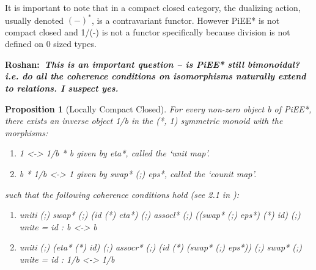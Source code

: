 \documentclass[preprint]{sigplanconf}
\newcommand{\xcomment}[2]{\textbf{#1:~\textsl{#2}}}
\newcommand{\roshan}[1]{\xcomment{Roshan}{#1}}
\newcommand{\asterix}[0]{*}
\newtheorem{proposition}[theorem]{Proposition}
\begin{document}
It is important to note that in a compact closed category, the
dualizing action, usually denoted $(-)^\asterix$, is a contravariant
functor. However {{PiEE*}} is not compact closed and {{1/(-)}} is not
a functor specifically because division is not defined on 0 sized
types.

\roshan{This is an important question -- is {{PiEE*}} still
  bimonoidal? i.e. do all the coherence conditions on isomorphisms
  naturally extend to relations. I suspect yes.}

\begin{proposition}[Locally Compact Closed]
For every non-zero object {{b}} of {{PiEE*}}, there exists an inverse
object {{1/b}} in the {{(*, 1)}} symmetric monoid with the morphisms:

\begin{enumerate}
\item {{1 <-> 1/b * b}} given by {{eta*}}, called the `unit map'.
\item {{b * 1/b <-> 1}} given by {{swap* (;) eps*}}, called the `counit map'.
\end{enumerate}

\noindent
such that the following coherence conditions hold (see 2.1 in
\cite{selinger2007dagger}):


\begin{enumerate}
\item {{uniti (;) swap* (;) (id (*) eta*) (;) assocl* (;) ((swap* (;) eps*) (*) id) (;) unite = id : b <-> b}}
\item {{uniti (;) (eta* (*) id) (;) assocr* (;) (id (*) (swap* (;) eps*)) (;) swap* (;) unite = id : 1/b <-> 1/b}}


               

\end{enumerate}
\end{proposition}
\end{document}
